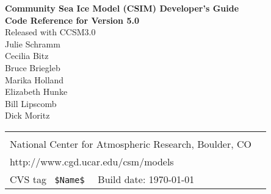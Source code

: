 \documentclass[]{article}
\newif\ifpdf
\begin{document}

 \newenvironment{Ventry}[1]%
   {\begin{list}{}{\renewcommand{\makelabel}[1]{\textsf{##1:}\hfil}%
      \settowidth{\labelwidth}{\textsf{#1:}}%
      \setlength{\leftmargin}{1.5cm}%
      \setlength{\labelwidth}{1.0cm}%
      \setlength{\itemsep}{0pt}%
      \setlength{\parsep}{0pt}}}%
   {\end{list}}


\ifpdf
\DeclareGraphicsExtensions{.jpg,.pdf}
\else
{}
\fi

\begin{titlepage}

\vspace*{2in}

\begin{center}
{\Large
  {\bf Community Sea Ice Model (CSIM) Developer's Guide} \\
  {\bf Code Reference for Version 5.0} \\
  \vspace{0.2in}
  {Released with CCSM3.0} \\
  \vspace{.5in}
  Julie Schramm \\
  Cecilia Bitz  \\
  Bruce Briegleb \\
  Marika Holland \\
  Elizabeth Hunke \\
  Bill Lipscomb \\
  Dick Moritz \\
}
\end{center}

\vspace{2in}
\begin{tabular}{p{5in}p{.9in}}
\noindent {\bf Community Climate System Model} \\
\noindent National Center for Atmospheric Research, Boulder, CO \\
\noindent http://www.cgd.ucar.edu/csm/models \\
\hline
\noindent CVS tag \verb+ $Name$  +  Build date: \today \\
\end{tabular}

\end{titlepage}
\end{document}
